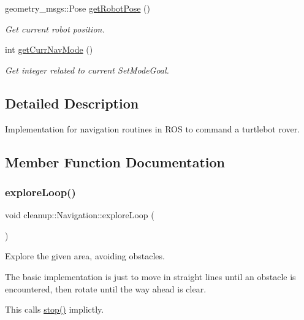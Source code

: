 \begin{DoxyCompactItemize}
geometry\+\_\+msgs\+::\+Pose \hyperlink{classcleanup_1_1_navigation_a4b39246f07e511da75444ca2ed655326}{get\+Robot\+Pose} ()
\begin{DoxyCompactList}\small\item\em Get current robot position. \end{DoxyCompactList}\item 
\mbox{\label{classcleanup_1_1_navigation_abde0f634a0a8bee3603c16ae921c772a}} 
int \hyperlink{classcleanup_1_1_navigation_abde0f634a0a8bee3603c16ae921c772a}{get\+Curr\+Nav\+Mode} ()
\begin{DoxyCompactList}\small\item\em Get integer related to current Set\+Mode\+Goal. \end{DoxyCompactList}\end{DoxyCompactItemize}


\subsection{Detailed Description}
Implementation for navigation routines in R\+OS to command a turtlebot rover. 

\subsection{Member Function Documentation}
\mbox{\label{classcleanup_1_1_navigation_a4990de9c7d80e4bd64dbb40f7bac596e}} 
\subsubsection{\texorpdfstring{explore\+Loop()}{exploreLoop()}}
{\footnotesize\ttfamily void cleanup\+::\+Navigation\+::explore\+Loop (\begin{DoxyParamCaption}{ }\end{DoxyParamCaption})}



Explore the given area, avoiding obstacles. 

The basic implementation is just to move in straight lines until an obstacle is encountered, then rotate until the way ahead is clear.

This calls \hyperlink{classcleanup_1_1_navigation_aa95c5e9bef0d4780c828ee5952964f8f}{stop()} implictly. \mbox{\label{classcleanup_1_1_navigation_a4b39246f07e511da75444ca2ed655326}} 
